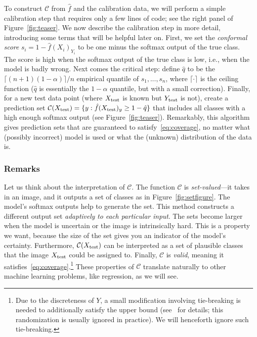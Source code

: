 \documentclass[10pt]{article}
\newcommand{\C}{\mathcal{C}}
\begin{document}
To construct $\C$ from $\hat{f}$ and the calibration data, we will perform a simple calibration step that requires only a few lines of code; see the right panel of Figure~\ref{fig:teaser}. 
We now describe the calibration step in more detail, introducing some terms that will be helpful later on. 
First, we set the \emph{conformal score} $s_i=1-\hat{f}(X_i)_{Y_i}$ to be one minus the softmax output of the true class. 
The score is high when the softmax output of the true class is low, i.e., when the model is badly wrong.
Next comes the critical step: define $\hat{q}$ to be the $\lceil(n+1)(1-\alpha)\rceil/n$ empirical quantile of $s_1,...,s_n$, where $\lceil \cdot \rceil$ is the ceiling function
($\hat{q}$ is essentially the $1-\alpha$ quantile, but with a small correction). 
Finally, for a new test data point (where $X_{\rm test}$ is known but $Y_{\rm test}$ is not), create a prediction set $\C(X_{\rm test})=\{y : \hat{f}(X_{\rm test})_y \geq 1-\hat{q}\}$ that includes all classes with a high enough softmax output (see Figure~\ref{fig:teaser}).
Remarkably, this algorithm gives prediction sets that are guaranteed to satisfy~\eqref{eq:coverage}, no matter what (possibly incorrect) model is used or what the (unknown) distribution of the data is.

\subsubsection*{Remarks}

Let us think about the interpretation of $\C$.
The function $\C$ is \emph{set-valued}---it takes in an image, and it outputs a set of classes as in Figure~\ref{fig:setfigure}.
The model's softmax outputs help to generate the set.
This method constructs a different output set \emph{adaptively to each particular input}.
The sets become larger when the model is uncertain or the image is intrinsically hard.
This is a property we want, because the size of the set gives you an indicator of the model's certainty.
Furthermore, $\C(X_{\rm test})$ can be interpreted as a set of plausible classes that the image $X_{\rm test}$ could be assigned to.
Finally, $\C$ is \emph{valid}, meaning it satisfies~\eqref{eq:coverage}.\footnote{Due to the discreteness of $Y$, a small modification involving tie-breaking is needed to additionally satisfy the upper bound (see~\cite{angelopoulos2020sets} for details; this randomization is usually ignored in practice). We will henceforth ignore such tie-breaking.}
These properties of $\C$ translate naturally to other machine learning problems, like regression, as we will see.
\end{document}
